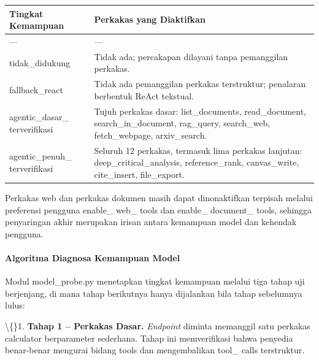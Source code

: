 \documentclass[12pt,a4paper]{article}
\begin{document}
\begin{table}[h]

\centering

\begin{tabular}{ll}

\toprule

Tingkat Kemampuan & Perkakas yang Diaktifkan \\

\midrule

--- & --- \\

tidak\_didukung & Tidak ada; percakapan dilayani tanpa pemanggilan perkakas. \\

fallback\_react & Tidak ada pemanggilan perkakas terstruktur; penalaran berbentuk ReAct tekstual. \\

agentic\_dasar\_ terverifikasi & Tujuh perkakas dasar: list\_documents, read\_document, search\_in\_document, rag\_query, search\_web, fetch\_webpage, arxiv\_search. \\

agentic\_penuh\_ terverifikasi & Seluruh 12 perkakas, termasuk lima perkakas lanjutan: deep\_critical\_analysis, reference\_rank, canvas\_write, cite\_insert, file\_export. \\

\bottomrule

\end{tabular}

\end{table}

Perkakas web dan perkakas dokumen masih dapat dinonaktifkan terpisah melalui preferensi pengguna enable\_ web\_ tools dan enable\_ document\_ tools, sehingga penyaringan akhir merupakan irisan antara kemampuan model dan kehendak pengguna.



\paragraph*{Algoritma Diagnosa Kemampuan Model}

Modul model\_probe.py menetapkan tingkat kemampuan melalui tiga tahap uji berjenjang, di mana tahap berikutnya hanya dijalankan bila tahap sebelumnya lulus:



\textbackslash\{\}1. \textbf{Tahap 1 -- Perkakas Dasar.} \textit{Endpoint} diminta memanggil satu perkakas calculator berparameter sederhana. Tahap ini memverifikasi bahwa penyedia benar-benar mengurai bidang tools dan mengembalikan tool\_ calls terstruktur.
\end{document}
